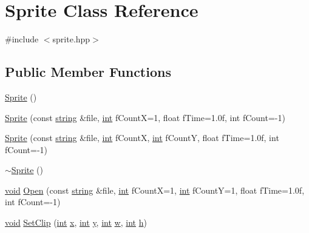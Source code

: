\hypertarget{class_sprite}{\section{Sprite Class Reference}
\label{class_sprite}
}


{\ttfamily \#include $<$sprite.\-hpp$>$}

\subsection*{Public Member Functions}
\begin{DoxyCompactItemize}
\item 
\hyperlink{class_sprite_a12cba3ac1868418add3c4d95ce87e615}{Sprite} ()
\item 
\hyperlink{class_sprite_a1dd38cbcb37dd53a6282fbdc2b698577}{Sprite} (const \hyperlink{_s_d_l__opengl__glext_8h_ae84541b4f3d8e1ea24ec0f466a8c568b}{string} \&file, \hyperlink{_s_d_l__thread_8h_a6a64f9be4433e4de6e2f2f548cf3c08e}{int} f\-Count\-X=1, float f\-Time=1.\-0f, int f\-Count=-\/1)
\item 
\hyperlink{class_sprite_ad89bfc6ea1a4f109ffda930452aced2d}{Sprite} (const \hyperlink{_s_d_l__opengl__glext_8h_ae84541b4f3d8e1ea24ec0f466a8c568b}{string} \&file, \hyperlink{_s_d_l__thread_8h_a6a64f9be4433e4de6e2f2f548cf3c08e}{int} f\-Count\-X, \hyperlink{_s_d_l__thread_8h_a6a64f9be4433e4de6e2f2f548cf3c08e}{int} f\-Count\-Y, float f\-Time=1.\-0f, int f\-Count=-\/1)
\item 
\hyperlink{class_sprite_a8accab430f9d90ae5117b57d67e32b84}{$\sim$\-Sprite} ()
\item 
\hyperlink{_s_d_l__opengles2__gl2ext_8h_ae5d8fa23ad07c48bb609509eae494c95}{void} \hyperlink{class_sprite_a8b96f1f8672d51322c707e434c47acc7}{Open} (const \hyperlink{_s_d_l__opengl__glext_8h_ae84541b4f3d8e1ea24ec0f466a8c568b}{string} \&file, \hyperlink{_s_d_l__thread_8h_a6a64f9be4433e4de6e2f2f548cf3c08e}{int} f\-Count\-X=1, \hyperlink{_s_d_l__thread_8h_a6a64f9be4433e4de6e2f2f548cf3c08e}{int} f\-Count\-Y=1, float f\-Time=1.\-0f, int f\-Count=-\/1)
\item 
\hyperlink{_s_d_l__opengles2__gl2ext_8h_ae5d8fa23ad07c48bb609509eae494c95}{void} \hyperlink{class_sprite_a3ad46a400f83d41eaba2c2df77e0cf7c}{Set\-Clip} (\hyperlink{_s_d_l__thread_8h_a6a64f9be4433e4de6e2f2f548cf3c08e}{int} \hyperlink{_s_d_l__opengl_8h_ad0e63d0edcdbd3d79554076bf309fd47}{x}, \hyperlink{_s_d_l__thread_8h_a6a64f9be4433e4de6e2f2f548cf3c08e}{int} \hyperlink{_s_d_l__opengl_8h_a1675d9d7bb68e1657ff028643b4037e3}{y}, \hyperlink{_s_d_l__thread_8h_a6a64f9be4433e4de6e2f2f548cf3c08e}{int} \hyperlink{_s_d_l__opengl__glext_8h_a6ee8f168a7ab6785a9bb57c6715dad99}{w}, \hyperlink{_s_d_l__thread_8h_a6a64f9be4433e4de6e2f2f548cf3c08e}{int} \hyperlink{_s_d_l__opengl__glext_8h_afa0fb1b5e976920c0abeff2dca3ed774}{h})

\end{DoxyCompactItemize}
